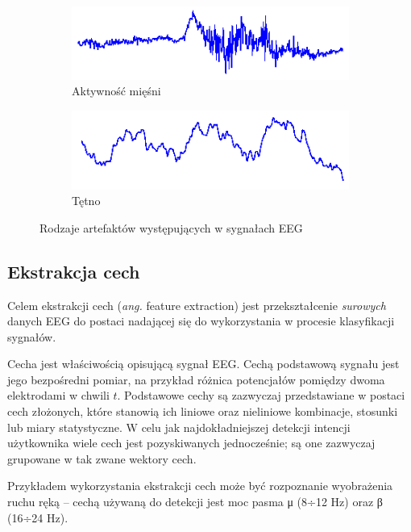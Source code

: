 \documentclass[skorowidz,skroty]{dyplomWEZUT}
\begin{document}
\begin{figure}[htb]
    \medskip
    \begin{subfigure}{0.48\textwidth}
    \includegraphics[width=\linewidth]{graphic/eeg_noise_muscle}
    \caption{Aktywność mięśni}
    \end{subfigure}\hspace*{\fill}
    \begin{subfigure}{0.48\textwidth}
    \includegraphics[width=\linewidth]{graphic/eeg_noise_pulse}
    \caption{Tętno}
    \end{subfigure}
    
    \caption{Rodzaje artefaktów występujących w sygnałach EEG\label{fig:eeg_noise}}
\end{figure}


\subsection{Ekstrakcja cech}
Celem ekstrakcji cech (\textit{ang.} feature extraction) jest przekształcenie \textit{surowych} danych EEG do postaci nadającej się do wykorzystania w procesie klasyfikacji sygnałów\cite{bci_robotics}.

Cecha jest właściwością opisującą sygnał EEG\cite{bci_foundations}. Cechą podstawową sygnału jest jego bezpośredni pomiar\cite{bci_principles}, na przykład różnica potencjałów pomiędzy dwoma elektrodami w chwili $t$. Podstawowe cechy są zazwyczaj przedstawiane w postaci cech złożonych, które stanowią ich liniowe oraz nieliniowe kombinacje, stosunki lub miary statystyczne. W celu jak najdokładniejszej detekcji intencji użytkownika wiele cech jest pozyskiwanych jednocześnie; są one zazwyczaj grupowane w tak zwane wektory cech\cite{bci_foundations}. 

Przykładem wykorzystania ekstrakcji cech może być rozpoznanie wyobrażenia ruchu ręką -- cechą używaną do detekcji jest moc pasma μ (8÷12 Hz) oraz β (16÷24 Hz)\cite{bci_foundations}.
\end{document}
